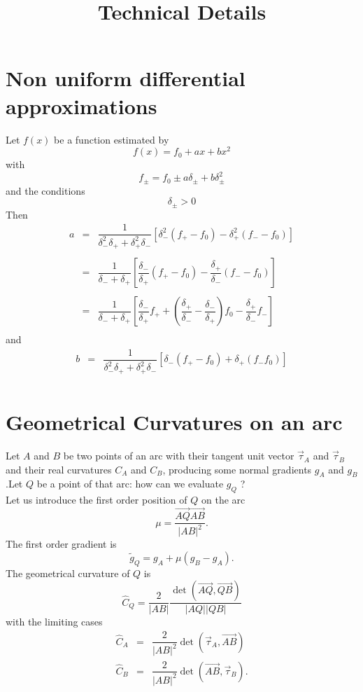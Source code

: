 \documentclass[11pt]{amsart}
\title{Technical Details}
\newcommand{\myvec}[1]{\overrightarrow{#1}}
\begin{document}
\maketitle


\section{Non uniform differential approximations}

Let $f(x)$ be a function estimated by
\[
	f(x) = f_0 + ax + b x^2
\]
with
\[
	f_\pm = f_0 \pm a \delta_\pm + b \delta_\pm^2
\]
and the conditions
\[
	\delta_\pm > 0 %
\]
Then
\[
\begin{array}{rcl}
	a & = &
	\dfrac{1}{\delta_-^2\delta_+ + \delta_+^2\delta_-}
	\left[ 
	   \delta_-^2\left(f_+ - f_0 \right)
	 - \delta_+^2\left(f_- - f_0 \right)
	\right] \\
	\\
	& = & \dfrac{1}{\delta_- + \delta_+} 
	\left[
	 \dfrac{\delta_-}{\delta_+} \left(f_+ - f_0 \right)
	-\dfrac{\delta_+}{\delta_-} \left(f_- - f_0 \right)
	\right] \\
	\\
	& = & \dfrac{1}{\delta_- + \delta_+} 
	\left[
	\dfrac{\delta_-}{\delta_+} f_+
	+\left(\dfrac{\delta_+}{\delta_-} - \dfrac{\delta_-}{\delta_+}\right) f_0
	-\dfrac{\delta_+}{\delta_-} f_-
	\right]\\
\end{array}
\]
and
\[
\begin{array}{rcl}
	b & = & \dfrac{1}{\delta_-^2\delta_+ + \delta_+^2\delta_-}
	\left[ 
	\delta_- \left(f_+ - f_0\right) + \delta_+ \left(f_-f_0\right)
	\right]
\\
\end{array}
\]

\section{Geometrical Curvatures on an arc}
Let $A$ and $B$ be two points of an arc with their tangent unit vector $\vec{\tau}_A$
and $\vec{\tau}_B$ and their real curvatures $C_A$ and $C_B$, producing
some normal gradients $g_A$ and $g_B$.Let $Q$ be a point of that arc: 
how can we evaluate $g_Q$ ?\\
Let us introduce the first order position of $Q$ on the arc
\[
	\mu = \dfrac{\myvec{AQ}\myvec{AB}}{|AB|^2}.
\]
The first order gradient is
\[
	\tilde{g}_Q = g_A + \mu (g_B-g_A).
\]
The geometrical curvature of $Q$ is
\[
	\hat{C}_Q = \dfrac{2}{|AB|} \dfrac{\det(\myvec{AQ},\myvec{QB})}{|AQ||QB|}
\]
with the limiting cases
\[
	\begin{array}{rcl}
	\hat{C}_A & = & \dfrac{2}{|AB|^2}\det(\vec{\tau}_A,\myvec{AB}) \\
	\hat{C}_B & = & \dfrac{2}{|AB|^2}\det(\myvec{AB},\vec{\tau}_B). \\
	\end{array}
\]
\end{document}
